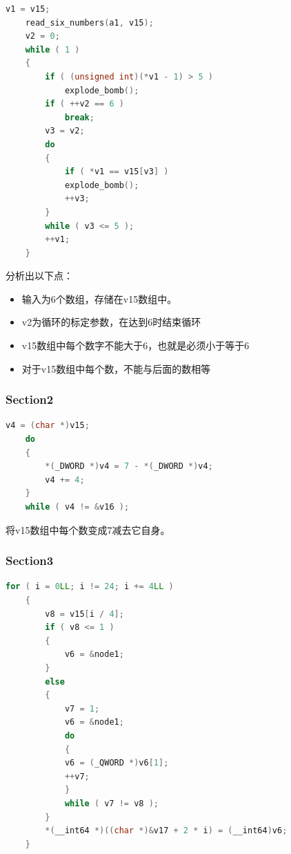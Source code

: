 \documentclass[a4pper,12pt,onecolumn]{article}
\begin{document}
\begin{lstlisting}[language=c]
    v1 = v15;
    read_six_numbers(a1, v15);
    v2 = 0;
    while ( 1 )
    {
        if ( (unsigned int)(*v1 - 1) > 5 )
            explode_bomb();
        if ( ++v2 == 6 )
            break;
        v3 = v2;
        do
        {
            if ( *v1 == v15[v3] )
            explode_bomb();
            ++v3;
        }
        while ( v3 <= 5 );
        ++v1;
    }
\end{lstlisting}

分析出以下点：

\begin{itemize}
    \item 输入为6个数组，存储在v15数组中。
    \item v2为循环的标定参数，在达到6时结束循环
    \item v15数组中每个数字不能大于6，也就是必须小于等于6
    \item 对于v15数组中每个数，不能与后面的数相等
\end{itemize}

\subsubsection{Section2}

\begin{lstlisting}[language=c]
    v4 = (char *)v15;
    do
    {
        *(_DWORD *)v4 = 7 - *(_DWORD *)v4;
        v4 += 4;
    }
    while ( v4 != &v16 );
\end{lstlisting}

将v15数组中每个数变成7减去它自身。

\subsubsection{Section3}

\begin{lstlisting}[language=c]
    for ( i = 0LL; i != 24; i += 4LL )
    {
        v8 = v15[i / 4];
        if ( v8 <= 1 )
        {
            v6 = &node1;
        }
        else
        {
            v7 = 1;
            v6 = &node1;
            do
            {
            v6 = (_QWORD *)v6[1];
            ++v7;
            }
            while ( v7 != v8 );
        }
        *(__int64 *)((char *)&v17 + 2 * i) = (__int64)v6;
    }
\end{lstlisting}
\end{document}
